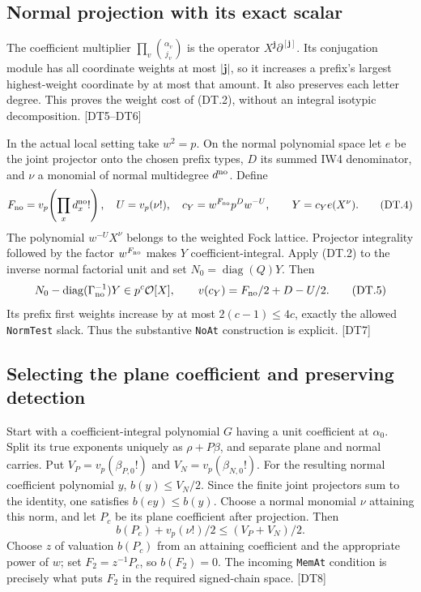 \subsection{Normal projection with its exact scalar}

The coefficient multiplier $\prod_v\binom{\alpha_v}{j_v}$ is the operator
$X^{\mathbf j}\partial^{[\mathbf j]}$. Its conjugation module has all coordinate weights at most $|\mathbf j|$, so it increases a prefix's largest highest-weight coordinate by at most that amount. It also preserves each letter degree. This proves the weight cost of (DT.2), without an integral isotypic decomposition. \textsf{[DT5--DT6]}

In the actual local setting take $w^2=p$. On the normal polynomial space let $e$ be the joint projector onto the chosen prefix types, $D$ its summed IW4 denominator, and $\nu$ a monomial of normal multidegree $d^{\rm no}$. Define
\[
 F_{\rm no}=v_p\!\left(\prod_xd_x^{\rm no}!\right),\quad U=v_p(\nu!),\quad
 c_Y=w^{F_{\rm no}}p^Dw^{-U},\qquad Y=c_Ye(X^\nu).
 \tag{DT.4}
\]
The polynomial $w^{-U}X^\nu$ belongs to the weighted Fock lattice. Projector integrality followed by the factor $w^{F_{\rm no}}$ makes $Y$ coefficient-integral. Apply (DT.2) to the inverse normal factorial unit and set $N_0=\operatorname{diag}(Q)Y$. Then
\[
 N_0-\operatorname{diag}(\Gamma_{\rm no}^{-1})Y
       \in p^c\mathcal O[X],\qquad
 v(c_Y)=F_{\rm no}/2+D-U/2.
 \tag{DT.5}
\]
Its prefix first weights increase by at most $2(c-1)\le4c$, exactly the allowed \texttt{NormTest} slack. Thus the substantive \texttt{NoAt} construction is explicit. \textsf{[DT7]}

\subsection{Selecting the plane coefficient and preserving detection}

Start with a coefficient-integral polynomial $G$ having a unit coefficient at $\alpha_0$. Split its true exponents uniquely as $\rho+P\beta$, and separate plane and normal carries. Put
$V_P=v_p(\beta_{P,0}!)$ and $V_N=v_p(\beta_{N,0}!)$.
For the resulting normal coefficient polynomial $y$, $b(y)\le V_N/2$.
Since the finite joint projectors sum to the identity, one satisfies $b(ey)\le b(y)$.
Choose a normal monomial $\nu$ attaining this norm, and let $P_c$ be its plane coefficient after projection. Then
\[
 b(P_c)+v_p(\nu!)/2\le(V_P+V_N)/2.
\]
Choose $z$ of valuation $b(P_c)$ from an attaining coefficient and the appropriate power of $w$; set $F_2=z^{-1}P_c$, so $b(F_2)=0$.
The incoming \texttt{MemAt} condition is precisely what puts $F_2$ in the required signed-chain space. \textsf{[DT8]}

